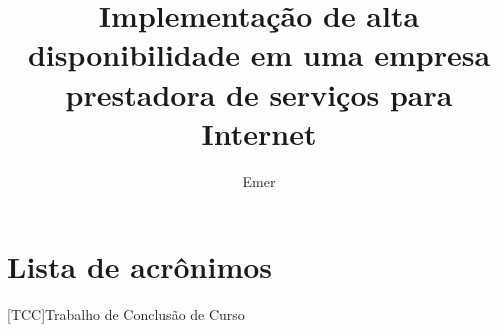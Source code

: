 \documentclass{iiufrgs}
\title{Implementação de alta disponibilidade em uma empresa prestadora de serviços para Internet}
\author{Emer}{Bruno}
\begin{document}
\maketitle



\tableofcontents

\chapter*{Lista de acrônimos}

\vspace{20px}

\begin{acronym}[XXXXXXXXXX]
[TCC]{Trabalho de Conclusão de Curso}

\end{acronym}

\listoffigures
\listoftables

\begin{abstract}

\end{abstract}




%
%



\end{document}
